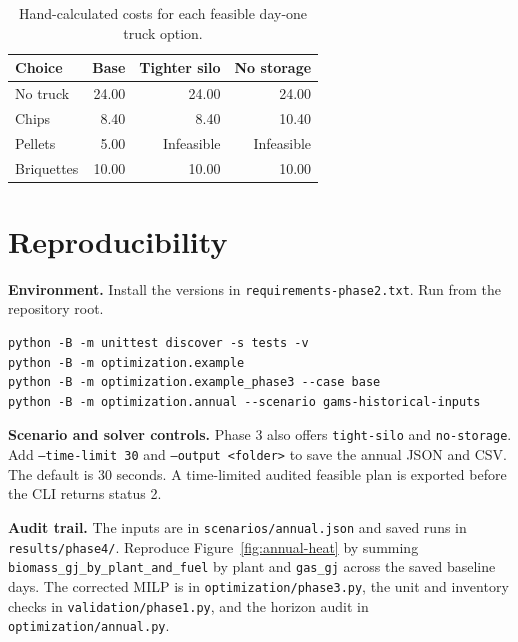 \documentclass[11pt,a4paper]{article}
\begin{document}
\begin{table}[htbp]
\small
\caption{Hand-calculated costs for each feasible day-one truck option.}
\label{tab:enum}
\begin{tabularx}{\textwidth}{@{}Yrrr@{}}
\toprule Choice & Base & Tighter silo & No storage\\ \midrule
No truck & 24.00 & 24.00 & 24.00\\
Chips & 8.40 & 8.40 & 10.40\\
Pellets & 5.00 & Infeasible & Infeasible\\
Briquettes & 10.00 & 10.00 & 10.00\\
\bottomrule
\end{tabularx}
\end{table}

\section{Reproducibility}
\textbf{Environment.} Install the versions in
\nolinkurl{requirements-phase2.txt}. Run from the repository root.

\medskip
\begin{lrbox}{\commandsbox}
\begin{minipage}{\dimexpr\linewidth-2\fboxsep\relax}
\vspace{4pt}
\begin{verbatim}
python -B -m unittest discover -s tests -v
python -B -m optimization.example
python -B -m optimization.example_phase3 --case base
python -B -m optimization.annual --scenario gams-historical-inputs
\end{verbatim}
\vspace{4pt}
\end{minipage}
\end{lrbox}
\noindent\colorbox{mist}{\usebox{\commandsbox}}

\medskip
\textbf{Scenario and solver controls.} Phase 3 also offers
\texttt{tight-silo} and \texttt{no-storage}. Add
\texttt{--time-limit 30} and \texttt{--output <folder>} to save the annual
JSON and CSV. The default is 30 seconds. A time-limited audited feasible
plan is exported before the CLI returns status 2.

\medskip
\textbf{Audit trail.} The inputs are in \nolinkurl{scenarios/annual.json}
and saved runs in \nolinkurl{results/phase4/}. Reproduce Figure~\ref{fig:annual-heat}
by summing \texttt{biomass\_gj\_by\_plant\_and\_fuel} by plant and
\texttt{gas\_gj} across the saved baseline days. The corrected MILP is in
\nolinkurl{optimization/phase3.py}, the unit and inventory checks in
\nolinkurl{validation/phase1.py}, and the horizon audit in
\nolinkurl{optimization/annual.py}.
\end{document}
